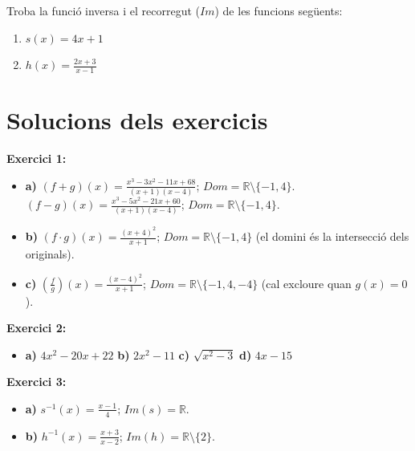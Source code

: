 \documentclass[12pt,a4paper]{article}
\begin{document}
\vspace{0.3cm}
Troba la funció inversa i el recorregut ($Im$) de les funcions següents:
\begin{enumerate}[label=\alph*)]
    \item $s(x) = 4x + 1$
    \item $h(x) = \frac{2x + 3}{x - 1}$
\end{enumerate}

\newpage
\section*{Solucions dels exercicis}

\textbf{Exercici 1:}
\begin{itemize}
    \item \textbf{a)} $(f+g)(x) = \frac{x^3-3x^2-11x+68}{(x+1)(x-4)}$; $Dom = \mathbb{R} \setminus \{-1, 4\}$. $(f-g)(x) = \frac{x^3-5x^2-21x+60}{(x+1)(x-4)}$; $Dom = \mathbb{R} \setminus \{-1, 4\}$.
    \item \textbf{b)} $(f \cdot g)(x) = \frac{(x+4)^2}{x+1}$; $Dom = \mathbb{R} \setminus \{-1, 4\}$ (el domini és la intersecció dels originals).
    \item \textbf{c)} $\left(\frac{f}{g}\right)(x) = \frac{(x-4)^2}{x+1}$; $Dom = \mathbb{R} \setminus \{-1, 4, -4\}$ (cal excloure quan $g(x)=0$).
\end{itemize}

\textbf{Exercici 2:}
\begin{itemize}
    \item \textbf{a)} $4x^2 - 20x + 22$ \quad \textbf{b)} $2x^2 - 11$ \quad \textbf{c)} $\sqrt{x^2-3}$ \quad \textbf{d)} $4x - 15$
\end{itemize}

\textbf{Exercici 3:}
\begin{itemize}
    \item \textbf{a)} $s^{-1}(x) = \frac{x-1}{4}$; $Im(s) = \mathbb{R}$.
    \item \textbf{b)} $h^{-1}(x) = \frac{x+3}{x-2}$; $Im(h) = \mathbb{R} \setminus \{2\}$.
\end{itemize}
\end{document}
